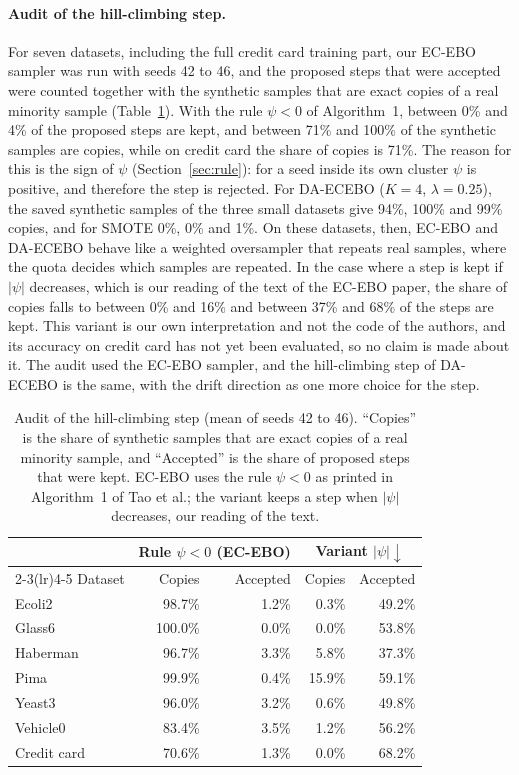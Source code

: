\documentclass[preprint,10pt]{elsarticle}
\begin{document}
\paragraph{Audit of the hill-climbing step.} For seven datasets, including the full credit card training part, our EC-EBO sampler was run with seeds 42 to 46, and the proposed steps that were accepted were counted together with the synthetic samples that are exact copies of a real minority sample (Table~\ref{tab:audit}). With the rule $\psi<0$ of Algorithm~1, between 0\% and 4\% of the proposed steps are kept, and between 71\% and 100\% of the synthetic samples are copies, while on credit card the share of copies is 71\%. The reason for this is the sign of $\psi$ (Section~\ref{sec:rule}): for a seed inside its own cluster $\psi$ is positive, and therefore the step is rejected. For DA-ECEBO ($K=4$, $\lambda=0.25$), the saved synthetic samples of the three small datasets give 94\%, 100\% and 99\% copies, and for SMOTE 0\%, 0\% and 1\%. On these datasets, then, EC-EBO and DA-ECEBO behave like a weighted oversampler that repeats real samples, where the quota decides which samples are repeated. In the case where a step is kept if $|\psi|$ decreases, which is our reading of the text of the EC-EBO paper, the share of copies falls to between 0\% and 16\% and between 37\% and 68\% of the steps are kept. This variant is our own interpretation and not the code of the authors, and its accuracy on credit card has not yet been evaluated, so no claim is made about it. The audit used the EC-EBO sampler, and the hill-climbing step of DA-ECEBO is the same, with the drift direction as one more choice for the step.

\begin{table}[!htbp]
\centering\small
\caption{Audit of the hill-climbing step (mean of seeds 42 to 46). ``Copies'' is the share of synthetic samples that are exact copies of a real minority sample, and ``Accepted'' is the share of proposed steps that were kept. EC-EBO uses the rule $\psi<0$ as printed in Algorithm~1 of Tao et al.; the variant keeps a step when $|\psi|$ decreases, our reading of the text.}\label{tab:audit}
\begin{tabular}{lrrrr}
\toprule
 & \multicolumn{2}{c}{Rule $\psi<0$ (EC-EBO)} & \multicolumn{2}{c}{Variant $|\psi|\downarrow$}\\
\cmidrule(lr){2-3}\cmidrule(lr){4-5}
Dataset & Copies & Accepted & Copies & Accepted\\
\midrule
Ecoli2 & 98.7\% & 1.2\% & 0.3\% & 49.2\%\\
Glass6 & 100.0\% & 0.0\% & 0.0\% & 53.8\%\\
Haberman & 96.7\% & 3.3\% & 5.8\% & 37.3\%\\
Pima & 99.9\% & 0.4\% & 15.9\% & 59.1\%\\
Yeast3 & 96.0\% & 3.2\% & 0.6\% & 49.8\%\\
Vehicle0 & 83.4\% & 3.5\% & 1.2\% & 56.2\%\\
Credit card & 70.6\% & 1.3\% & 0.0\% & 68.2\%\\
\bottomrule
\end{tabular}
\end{table}
\end{document}
